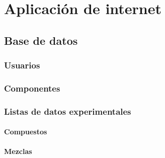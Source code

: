 \chapter{Aplicación de internet}
	\section{Base de datos}
		\subsection{Usuarios}
		\subsection{Componentes}
		\subsection{Listas de datos experimentales}
			\subsubsection{Compuestos}
			\subsubsection{Mezclas}

